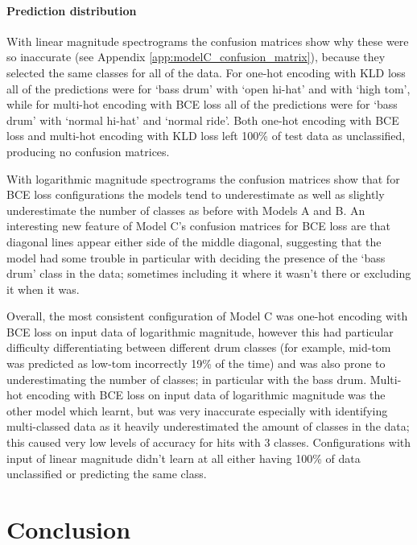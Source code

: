 \documentclass[12pt]{article}
\begin{document}
	\paragraph*{Prediction distribution}
	
	With linear magnitude spectrograms the confusion matrices show why these were so inaccurate (see Appendix \ref{app:modelC_confusion_matrix}), because they selected the same classes for all of the data. For one-hot encoding with KLD loss all of the predictions were for `bass drum' with `open hi-hat' and with `high tom', while for multi-hot encoding with BCE loss all of the predictions were for `bass drum' with `normal hi-hat' and `normal ride'. Both one-hot encoding with BCE loss and multi-hot encoding with KLD loss left 100\% of test data as unclassified, producing no confusion matrices.\medskip
	
	With logarithmic magnitude spectrograms the confusion matrices show that for BCE loss configurations the models tend to underestimate as well as slightly underestimate the number of classes as before with Models A and B. An interesting new feature of Model C's confusion matrices for BCE loss are that diagonal lines appear either side of the middle diagonal, suggesting that the model had some trouble in particular with deciding the presence of the `bass drum' class in the data; sometimes including it where it wasn't there or excluding it when it was.\medskip
	
	Overall, the most consistent configuration of Model C was one-hot encoding with BCE loss on input data of logarithmic magnitude, however this had particular difficulty differentiating between different drum classes (for example, mid-tom was predicted as low-tom incorrectly 19\% of the time) and was also prone to underestimating the number of classes; in particular with the bass drum. Multi-hot encoding with BCE loss on input data of logarithmic magnitude was the other model which learnt, but was very inaccurate especially with identifying multi-classed data as it heavily underestimated the amount of classes in the data; this caused very low levels of accuracy for hits with 3 classes. Configurations with input of linear magnitude didn't learn at all either having 100\% of data unclassified or predicting the same class.\medskip 
	
	\newpage
	\section{Conclusion}
	
\end{document}
